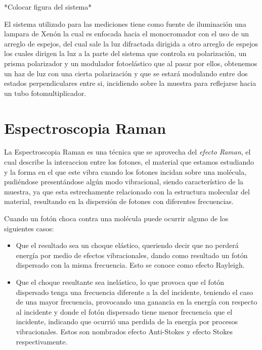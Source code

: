*Colocar figura del sistema*

El sistema utilizado para las mediciones tiene como fuente de iluminación una lampara de Xenón la cual es
enfocada hacia el monocromador con el uso de un arreglo de espejos, del cual sale la luz difractada dirigida a
otro arreglo de espejos los cuales dirigen la luz a la parte del sistema que controla su polarización, 
un prisma polarizador y un modulador fotoelástico que al pasar por ellos, obtenemos un haz de luz con 
una cierta polarización y que se estará modulando entre dos estados perpendiculares entre si, incidiendo sobre 
la muestra para reflejarse hacia un tubo fotomultiplicador.\cite{LastrasMartnez1993}

\newpage

\section{Espectroscopia Raman}
\label{sec:chap3-raman}
La Espectroscopia Raman es una técnica que se aprovecha del \textit{efecto Raman}, el cual describe la interaccion
entre los fotones, el material que estamos estudiando y la forma en el que este vibra cuando los fotones incidan 
sobre una molécula, pudiéndose presentándose algún modo vibracional, siendo característico de la muestra, 
ya que esta estrechamente relacionado con la estructura molecular del material, resultando en la dispersión de 
fotones con diferentes frecuencias.

Cuando un fotón choca contra una molécula puede ocurrir alguno de los siguientes casos:
    \begin{itemize}
        \item Que el resultado sea un choque elástico, queriendo decir que no perderá energía por medio de
        efectos vibracionales, dando como resultado un fotón dispersado con la misma frecuencia. Esto se conoce 
        como efecto Rayleigh.

        \item Que el choque resultante sea inelástico, lo que provoca que el fotón dispersado tenga una frecuencia 
        diferente a la del incidente, teniendo el caso de una mayor frecuencia, provocando una ganancia en la energía 
        con respecto al incidente y donde el fotón dispersado tiene menor frecuencia que el incidente, indicando que 
        ocurrió una perdida de la energía por procesos vibracionales. Estos son nombrados efecto Anti-Stokes y efecto 
        Stokes respectivamente.
    \end{itemize}

